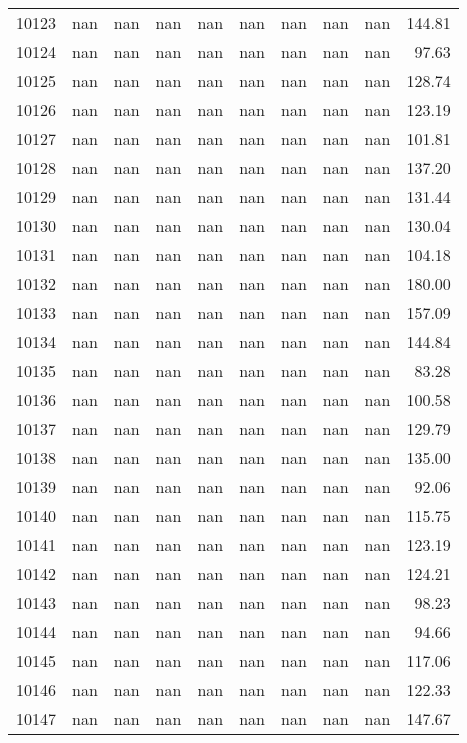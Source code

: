 \begin{tabular}{lrrrrrrrrr}
10123 & nan & nan & nan & nan & nan & nan & nan & nan & 144.81 \\
10124 & nan & nan & nan & nan & nan & nan & nan & nan & 97.63 \\
10125 & nan & nan & nan & nan & nan & nan & nan & nan & 128.74 \\
10126 & nan & nan & nan & nan & nan & nan & nan & nan & 123.19 \\
10127 & nan & nan & nan & nan & nan & nan & nan & nan & 101.81 \\
10128 & nan & nan & nan & nan & nan & nan & nan & nan & 137.20 \\
10129 & nan & nan & nan & nan & nan & nan & nan & nan & 131.44 \\
10130 & nan & nan & nan & nan & nan & nan & nan & nan & 130.04 \\
10131 & nan & nan & nan & nan & nan & nan & nan & nan & 104.18 \\
10132 & nan & nan & nan & nan & nan & nan & nan & nan & 180.00 \\
10133 & nan & nan & nan & nan & nan & nan & nan & nan & 157.09 \\
10134 & nan & nan & nan & nan & nan & nan & nan & nan & 144.84 \\
10135 & nan & nan & nan & nan & nan & nan & nan & nan & 83.28 \\
10136 & nan & nan & nan & nan & nan & nan & nan & nan & 100.58 \\
10137 & nan & nan & nan & nan & nan & nan & nan & nan & 129.79 \\
10138 & nan & nan & nan & nan & nan & nan & nan & nan & 135.00 \\
10139 & nan & nan & nan & nan & nan & nan & nan & nan & 92.06 \\
10140 & nan & nan & nan & nan & nan & nan & nan & nan & 115.75 \\
10141 & nan & nan & nan & nan & nan & nan & nan & nan & 123.19 \\
10142 & nan & nan & nan & nan & nan & nan & nan & nan & 124.21 \\
10143 & nan & nan & nan & nan & nan & nan & nan & nan & 98.23 \\
10144 & nan & nan & nan & nan & nan & nan & nan & nan & 94.66 \\
10145 & nan & nan & nan & nan & nan & nan & nan & nan & 117.06 \\
10146 & nan & nan & nan & nan & nan & nan & nan & nan & 122.33 \\
10147 & nan & nan & nan & nan & nan & nan & nan & nan & 147.67 \\

\end{tabular}

